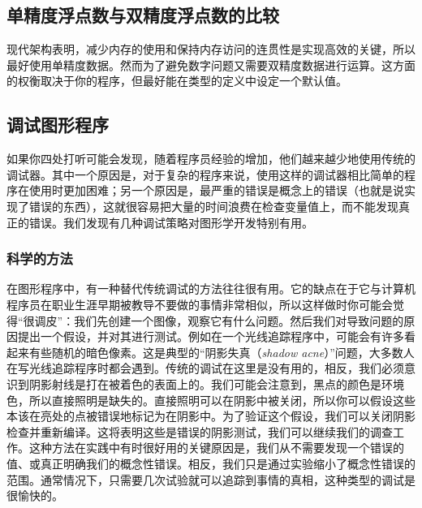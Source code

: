 \documentclass[lang=cn,12pt,marginpar=margintrue]{elegantbook}
\begin{document}
\subsection{单精度浮点数与双精度浮点数的比较 }

现代架构表明，减少内存的使用和保持内存访问的连贯性是实现高效的关键，所以最好使用单精度数据。然而为了避免数字问题又需要双精度数据进行运算。这方面的权衡取决于你的程序，但最好能在类型的定义中设定一个默认值。



\subsection{调试图形程序}

如果你四处打听可能会发现，随着程序员经验的增加，他们越来越少地使用传统的调试器。其中一个原因是，对于复杂的程序来说，使用这样的调试器相比简单的程序在使用时更加困难；另一个原因是，最严重的错误是概念上的错误（也就是说实现了错误的东西），这就很容易把大量的时间浪费在检查变量值上，而不能发现真正的错误。我们发现有几种调试策略对图形学开发特别有用。

\subsubsection{科学的方法}

在图形程序中，有一种替代传统调试的方法往往很有用。它的缺点在于它与计算机程序员在职业生涯早期被教导不要做的事情非常相似，所以这样做时你可能会觉得“很调皮”：我们先创建一个图像，观察它有什么问题。然后我们对导致问题的原因提出一个假设，并对其进行测试。例如在一个光线追踪程序中，可能会有许多看起来有些随机的暗色像素。这是典型的“阴影失真（\textit{shadow acne}）”问题，大多数人在写光线追踪程序时都会遇到。传统的调试在这里是没有用的，相反，我们必须意识到阴影射线是打在被着色的表面上的。我们可能会注意到，黑点的颜色是环境色，所以直接照明是缺失的。直接照明可以在阴影中被关闭，所以你可以假设这些本该在亮处的点被错误地标记为在阴影中。为了验证这个假设，我们可以关闭阴影检查并重新编译。这将表明这些是错误的阴影测试，我们可以继续我们的调查工作。这种方法在实践中有时很好用的关键原因是，我们从不需要发现一个错误的值、或真正明确我们的概念性错误。相反，我们只是通过实验缩小了概念性错误的范围。通常情况下，只需要几次试验就可以追踪到事情的真相，这种类型的调试是很愉快的。
\end{document}
